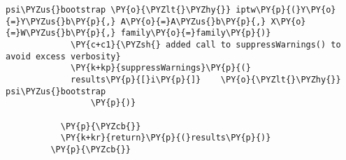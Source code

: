 \begin{Verbatim}[commandchars=\\\{\}]
             psi\PYZus{}bootstrap \PY{o}{\PYZlt{}\PYZhy{}} iptw\PY{p}{(}Y\PY{o}{=}Y\PYZus{}b\PY{p}{,} A\PY{o}{=}A\PYZus{}b\PY{p}{,} X\PY{o}{=}W\PYZus{}b\PY{p}{,} family\PY{o}{=}family\PY{p}{)}
             \PY{c+c1}{\PYZsh{} added call to suppressWarnings() to avoid excess verbosity}
             \PY{k+kp}{suppressWarnings}\PY{p}{(}
             results\PY{p}{[}i\PY{p}{]}    \PY{o}{\PYZlt{}\PYZhy{}} psi\PYZus{}bootstrap
                 \PY{p}{)}
               
           \PY{p}{\PYZcb{}}
           \PY{k+kr}{return}\PY{p}{(}results\PY{p}{)}
         \PY{p}{\PYZcb{}}
\end{Verbatim}


